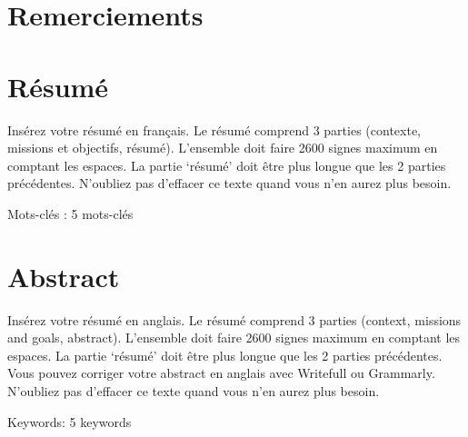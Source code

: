 \documentclass[11pt,titlepage]{article}
\begin{document}
\def\endabstract{\par
\endquotation
}
\newpage
 
\section*{Remerciements}


\newpage
 
\section*{Résumé}

Insérez votre résumé en français.
Le résumé comprend 3 parties (contexte, missions et objectifs, résumé). L’ensemble doit faire 2600 signes maximum en comptant les espaces. La partie ‘résumé’ doit être plus longue que les 2 parties précédentes.
N’oubliez pas d’effacer ce texte quand vous n’en aurez plus besoin.

Mots-clés : 5 mots-clés

\newpage
 
\section*{Abstract}
Insérez votre résumé en anglais.
Le résumé comprend 3 parties (context, missions and goals, abstract). L’ensemble doit faire 2600 signes maximum en comptant les espaces. La partie ‘résumé’ doit être plus longue que les 2 parties précédentes.
Vous pouvez corriger votre abstract en anglais avec Writefull ou Grammarly.
N’oubliez pas d’effacer ce texte quand vous n’en aurez plus besoin.

Keywords: 5 keywords

\newpage

\renewcommand{\baselinestretch}{1.0}\normalsize
\tableofcontents
\renewcommand{\baselinestretch}{1.15}\normalsize

\newpage
 
\listoffigures
\newpage
 
\listoftables
\newpage

\end{document}
